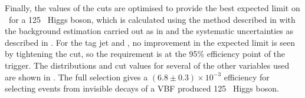 Finally, the values of the cuts are optimised to provide the best expected limit on \BRinv\, for a 125 \GeV\, Higgs boson, which is calculated using the method described in  with the background estimation carried out as in  and the systematic uncertainties as described in . For the tag jet \pt and \MET, no improvement in the expected limit is seen by tightening the cut, so the requirement is at the 95\% efficiency point of the trigger. The distributions and cut values for several of the other variables used are shown in . The full selection gives a $(6.8\pm 0.3)\times 10^{-3}$ efficiency for selecting events from invisible decays of a VBF produced 125 \GeV\, Higgs boson.  

